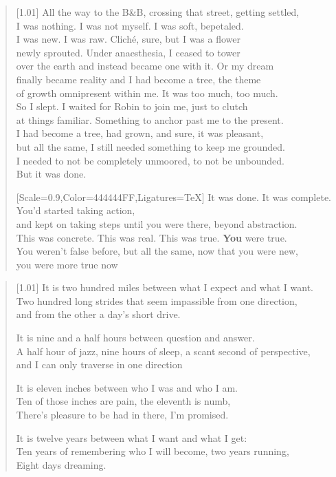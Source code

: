 \begin{verse}[1.01\textwidth]
  All the way to the B\&B, crossing that street, getting settled,\\
  I was nothing. I was not myself. I was soft, bepetaled.\\
  I was new. I was raw. Cliché, sure, but I was a flower\\
  newly sprouted. Under anaesthesia, I ceased to tower\\
  over the earth and instead became one with it. Or my dream\\
  finally became reality and I had become a tree, the theme\\
  of growth omnipresent within me. It was too much, too much.\\
  So I slept. I waited for Robin to join me, just to clutch\\
  at things familiar. Something to anchor past me to the present.\\
  I had become a tree, had grown, and sure, it was pleasant,\\
  but all the same, I still needed something to keep me grounded.\\
  I needed to not be completely unmoored, to not be unbounded.\\
  But it was done.

  {[Scale=0.9,Color=444444FF,Ligatures=TeX]
  \vin It was done. It was complete. You'd started taking action,\\
  \vin and kept on taking steps until you were there, beyond abstraction.\\
  \vin This was concrete. This was real. This was true. \textbf{You} were true.\\
  \vin You weren't false before, but all the same, now that you were new,\\
  \vin you were more true now}
\end{verse}
\newpage

\null
\vfill
\begin{verse}[1.01\textwidth]
It is two hundred miles between what I expect and what I want.\\
Two hundred long strides that seem impassible from one direction,\\
\vin and from the other a day's short drive.

It is nine and a half hours between question and answer.\\
A half hour of jazz, nine hours of sleep, a scant second of perspective,\\
\vin and I can only traverse in one direction

It is eleven inches between who I was and who I am.\\
Ten of those inches are pain, the eleventh is numb,\\
\vin There's pleasure to be had in there, I'm promised.

It is twelve years between what I want and what I get:\\
Ten years of remembering who I will become, two years running,\\
\vin Eight days dreaming.
\end{verse}
\vfill
\newpage

